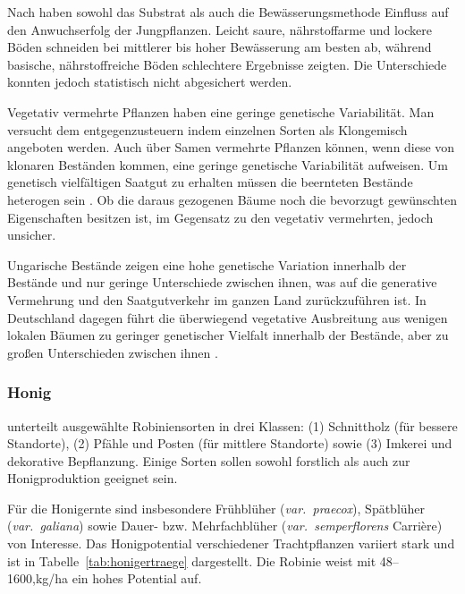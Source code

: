 \documentclass[twocolumn]{scrartcl}
\begin{document}
Nach \citet{draghici2024robinie} haben sowohl das Substrat als auch
die Bewässerungsmethode Einfluss auf den Anwuchserfolg der
Jungpflanzen. Leicht saure, nährstoffarme und lockere Böden schneiden
bei mittlerer bis hoher Bewässerung am besten ab, während basische,
nährstoffreiche Böden schlechtere Ergebnisse zeigten. Die Unterschiede
konnten jedoch statistisch nicht abgesichert werden.

Vegetativ vermehrte Pflanzen haben eine geringe genetische
Variabilität.  Man versucht dem entgegenzusteuern indem einzelnen
Sorten als Klongemisch angeboten werden. Auch über Samen vermehrte
Pflanzen können, wenn diese von klonaren Beständen kommen, eine
geringe genetische Variabilität aufweisen.  Um genetisch vielfältigen
Saatgut zu erhalten müssen die beernteten Bestände heterogen sein
\citep{pakull2024robinieKlon}. Ob die daraus gezogenen Bäume noch die
bevorzugt gewünschten Eigenschaften besitzen ist, im Gegensatz zu den
vegetativ vermehrten, jedoch unsicher.

Ungarische Bestände zeigen eine hohe genetische Variation innerhalb
der Bestände und nur geringe Unterschiede zwischen ihnen, was auf die
generative Vermehrung und den Saatgutverkehr im ganzen Land
zurückzuführen ist. In Deutschland dagegen führt die überwiegend
vegetative Ausbreitung aus wenigen lokalen Bäumen zu geringer
genetischer Vielfalt innerhalb der Bestände, aber zu großen
Unterschieden zwischen ihnen \citep{liesebach2011robinie}.

\subsubsection{Honig}

\citet{keresztesi1983robinie} unterteilt ausgewählte Robiniensorten in drei Klassen: 
(1) Schnittholz (für bessere Standorte), 
(2) Pfähle und Posten (für mittlere Standorte) sowie 
(3) Imkerei und dekorative Bepflanzung. 
Einige Sorten sollen sowohl forstlich als auch zur Honigproduktion geeignet sein.

Für die Honigernte sind insbesondere Frühblüher
(\emph{var.\ praecox}), Spätblüher (\emph{var.\ galiana}) sowie Dauer-
bzw. Mehrfachblüher (\emph{var.\ semperflorens} Carrière) von
Interesse.  Das Honigpotential verschiedener Trachtpflanzen variiert
stark und ist in Tabelle~\ref{tab:honigertraege} dargestellt. Die
Robinie weist mit 48--1600,kg/ha ein hohes Potential auf.
\end{document}
